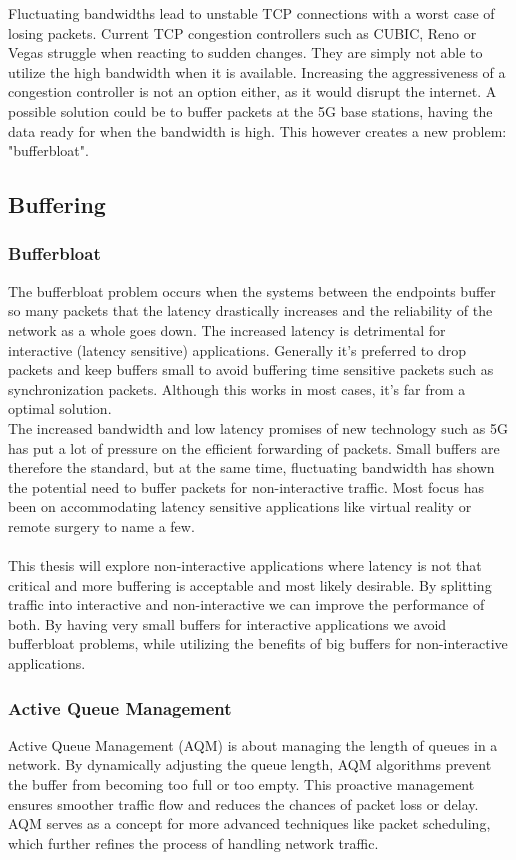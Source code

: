\documentclass[a4paper,english, 11pt]{report}
\begin{document}
Fluctuating bandwidths lead to unstable TCP connections with a worst case of losing packets. Current TCP congestion controllers such as CUBIC, Reno or Vegas struggle when reacting to sudden changes.\cite{bandwidth_changes} They are simply not able to utilize the high bandwidth when it is available. Increasing the aggressiveness of a congestion controller is not an option either, as it would disrupt the internet. A possible solution could be to buffer packets at the 5G base stations, having the data ready for when the bandwidth is high. This however creates a new problem: "bufferbloat".


\subsection{Buffering}
\subsubsection{Bufferbloat}
The bufferbloat problem occurs when the systems between the endpoints buffer so many packets that the latency drastically increases and the reliability of the network as a whole goes down. The increased latency is detrimental for interactive (latency sensitive) applications. Generally it's preferred to drop packets and keep buffers small to avoid buffering time sensitive packets such as synchronization packets. Although this works in most cases, it's far from a optimal solution.\\

The increased bandwidth and low latency promises of new technology such as 5G has put a lot of pressure on the efficient forwarding of packets. Small buffers are therefore the standard, but at the same time, fluctuating bandwidth has shown the potential need to buffer packets for non-interactive traffic.
Most focus has been on accommodating latency sensitive applications like virtual reality or remote surgery to name a few.\\\\
This thesis will explore non-interactive applications where latency is not that critical and more buffering is acceptable and most likely desirable. By splitting traffic into interactive and non-interactive we can improve the performance of both. By having very small buffers for interactive applications we avoid bufferbloat problems, while utilizing the benefits of big buffers for non-interactive applications.\\

\subsubsection{Active Queue Management}
Active Queue Management (AQM) is about managing the length of queues in a network. By dynamically adjusting the queue length, AQM algorithms\cite{aqm_survey} prevent the buffer from becoming too full or too empty\cite{aqm}. This proactive management ensures smoother traffic flow and reduces the chances of packet loss or delay. AQM serves as a concept for more advanced techniques like packet scheduling, which further refines the process of handling network traffic.
\end{document}
